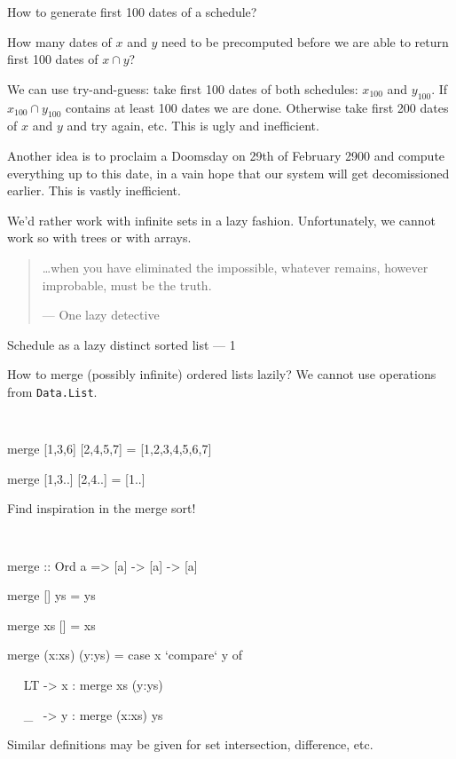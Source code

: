 \documentclass[handout]{beamer}
\begin{document}
\begin{frame}{How to generate first 100  dates of a schedule?}

How many dates of $x$ and $y$ need to be precomputed
before we are able to return first 100 dates of $x \cap y$?

\bigskip

\pause
We can use try-and-guess: take first 100 dates of both
schedules: $x_{100}$ and $y_{100}$.
If $x_{100} \cap y_{100}$ contains at least 100 dates
we are done. Otherwise take first 200 dates of $x$ and $y$
and try again, etc.
This is ugly and inefficient.

\bigskip

\pause
Another idea is to proclaim a Doomsday
on 29th of February 2900 and compute everything up to this date,
in a vain hope that our system will get decomissioned earlier.
This is vastly inefficient.

\bigskip

\pause
We'd rather work with infinite sets
in a lazy fashion. Unfortunately, we cannot work so with
trees or with arrays.

\pause
\begin{quote}
\ldots when you have eliminated the impossible, whatever remains, however improbable, must be the truth.

\flushright --- One lazy detective
\end{quote}

\end{frame}

\begin{frame}{Schedule as a lazy distinct sorted list --- 1}

How to merge (possibly infinite) ordered lists lazily?
We cannot use operations from {\tt Data.List}.

\bigskip

\pause
{\tt
\par merge [1,3,6] [2,4,5,7] = [1,2,3,4,5,6,7]
\par merge [1,3..] [2,4..] = [1..]
}

\bigskip

\pause
Find inspiration in the merge sort!

\bigskip

\pause
{\tt
\par merge :: Ord a => [a] -> [a] -> [a]
\par merge [] ys = ys
\par merge xs [] = xs
\par merge (x:xs) (y:ys) = case x `compare` y of
\par ~~  LT -> x : merge xs (y:ys)
\par ~~  \_~  -> y : merge (x:xs) ys
}

\bigskip

\pause
Similar definitions may be given for set intersection, difference, etc.

\end{frame}
\end{document}
